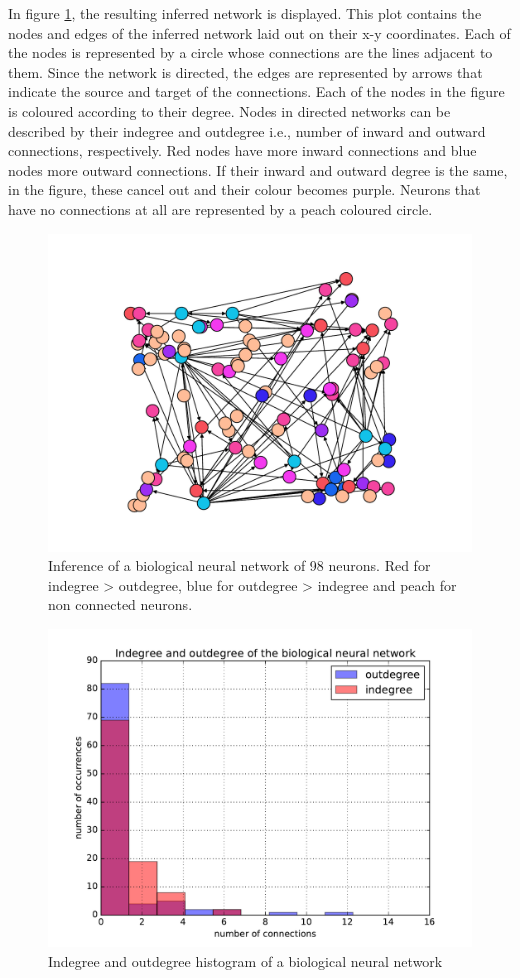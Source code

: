 In figure \ref{fig:crcns_4_network}, the resulting inferred network is displayed. This plot contains the nodes and edges of the inferred network laid out on their x-y coordinates. Each of the nodes is represented by a circle whose connections are the lines adjacent to them. Since the network is directed, the edges are represented by arrows that indicate the source and target of the connections. Each of the nodes in the figure is coloured according to their degree. Nodes in directed networks can be described by their indegree and outdegree i.e., number of inward and outward connections, respectively. Red nodes have more inward connections and blue nodes more outward connections. If their inward and outward degree is the same, in the figure, these cancel out and their colour becomes purple. Neurons that have no connections at all are represented by a peach coloured circle.\\

\begin{figure}
	\centering
	\includegraphics[width=0.8\linewidth]{crcns_4_50_xy.pdf}
	\caption{Inference of a biological neural network of 98 neurons. Red for indegree > outdegree, blue for outdegree > indegree and peach for non connected neurons.}
	\label{fig:crcns_4_network}
\end{figure}

\begin{figure}
	\centering
	\includegraphics[width=0.8\linewidth]{degree_histogram_real_network.pdf}
	\caption{Indegree and outdegree histogram of a biological neural network}
	\label{fig:degree_histogram}
\end{figure}

